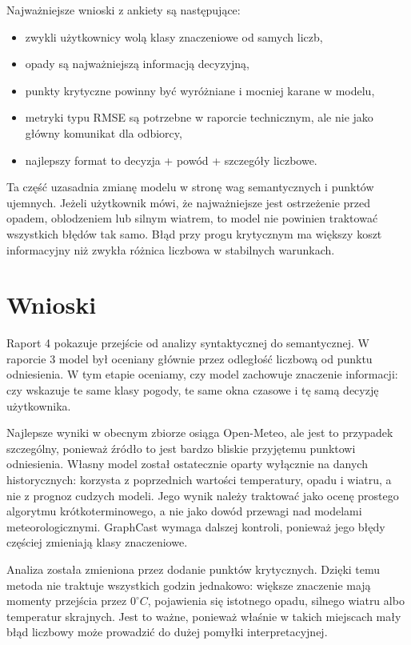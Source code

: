 \documentclass[a4paper,12pt]{article}
\begin{document}
Najważniejsze wnioski z ankiety są następujące:
\begin{itemize}
    \item zwykli użytkownicy wolą klasy znaczeniowe od samych liczb,
    \item opady są najważniejszą informacją decyzyjną,
    \item punkty krytyczne powinny być wyróżniane i mocniej karane w modelu,
    \item metryki typu RMSE są potrzebne w raporcie technicznym, ale nie jako główny komunikat dla odbiorcy,
    \item najlepszy format to decyzja + powód + szczegóły liczbowe.
\end{itemize}

\noindent
Ta część uzasadnia zmianę modelu w stronę wag semantycznych i punktów ujemnych.
Jeżeli użytkownik mówi, że najważniejsze jest ostrzeżenie przed opadem,
oblodzeniem lub silnym wiatrem, to model nie powinien traktować wszystkich
błędów tak samo. Błąd przy progu krytycznym ma większy koszt informacyjny niż
zwykła różnica liczbowa w stabilnych warunkach.
\newpage
\section{Wnioski}

Raport 4 pokazuje przejście od analizy syntaktycznej do semantycznej. W
raporcie 3 model był oceniany głównie przez odległość liczbową od punktu
odniesienia. W tym etapie oceniamy, czy model zachowuje znaczenie informacji:
czy wskazuje te same klasy pogody, te same okna czasowe i tę samą decyzję
użytkownika.

\noindent
Najlepsze wyniki w obecnym zbiorze osiąga Open-Meteo, ale jest to przypadek
szczególny, ponieważ źródło to jest bardzo bliskie przyjętemu punktowi
odniesienia. Własny model został ostatecznie oparty wyłącznie na danych
historycznych: korzysta z poprzednich wartości temperatury, opadu i wiatru, a
nie z prognoz cudzych modeli. Jego wynik należy traktować jako ocenę prostego
algorytmu krótkoterminowego, a nie jako dowód przewagi nad modelami
meteorologicznymi. GraphCast wymaga dalszej kontroli, ponieważ jego błędy
częściej zmieniają klasy znaczeniowe.

\noindent
Analiza została zmieniona przez dodanie punktów krytycznych. Dzięki temu
metoda nie traktuje wszystkich godzin jednakowo: większe znaczenie mają
momenty przejścia przez \(0^\circ C\), pojawienia się istotnego opadu,
silnego wiatru albo temperatur skrajnych. Jest to ważne, ponieważ właśnie w
takich miejscach mały błąd liczbowy może prowadzić do dużej pomyłki
interpretacyjnej.
\end{document}

